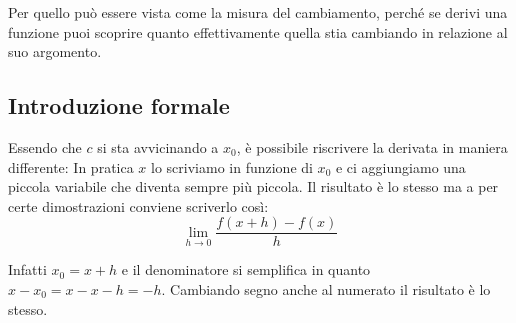 Per quello può essere vista come la misura del cambiamento, perché se derivi 
una funzione puoi scoprire quanto effettivamente quella stia cambiando in 
relazione al suo argomento.

\subsection{Introduzione formale}
Essendo che $c$ si sta avvicinando a $x_0$, è possibile riscrivere la derivata 
in maniera differente: In pratica $x$ lo scriviamo in funzione di $x_0$ e ci 
aggiungiamo una piccola variabile che diventa sempre più piccola. Il risultato 
è lo stesso ma a per certe dimostrazioni conviene scriverlo così:
\begin{equation*}
	\lim_{h \to 0} \dfrac{f(x + h) - f(x)}{h}
\end{equation*}

Infatti $x_0 = x + h$ e il denominatore si semplifica in quanto $x - x_0 = x - 
x - h = -h$. Cambiando segno anche al numerato il risultato è lo stesso.


